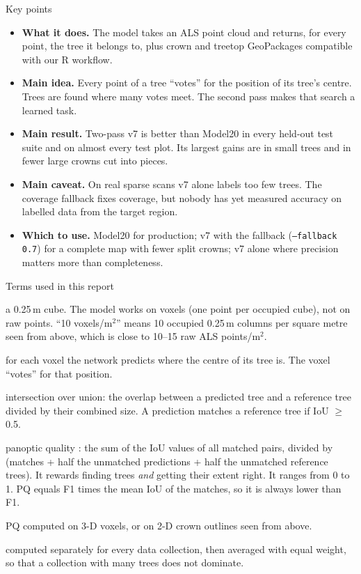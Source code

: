 \documentclass[11pt,a4paper]{article}
\newcommand{\ppsm}{points/m$^2$}
\newcommand{\vpsm}{voxels/m$^2$}
\newcommand{\code}[1]{\texttt{#1}}
\begin{document}
\begin{keybox}{Key points}
\begin{itemize}[leftmargin=12pt]
  \item \textbf{What it does.} The model takes an ALS point cloud and returns, for every point, the tree it belongs to, plus crown and treetop GeoPackages compatible with our R workflow.
  \item \textbf{Main idea.} Every point of a tree ``votes'' for the position of its tree's centre. Trees are found where many votes meet. The second pass makes that search a learned task.
  \item \textbf{Main result.} Two-pass v7 is better than Model20 in every held-out test suite and on almost every test plot. Its largest gains are in small trees and in fewer large crowns cut into pieces.
  \item \textbf{Main caveat.} On real sparse scans v7 alone labels too few trees. The coverage fallback fixes coverage, but nobody has yet measured accuracy on labelled data from the target region.
  \item \textbf{Which to use.} Model20 for production; v7 with the fallback (\code{--fallback 0.7}) for a complete map with fewer split crowns; v7 alone where precision matters more than completeness.
\end{itemize}
\end{keybox}

\begin{keybox}{Terms used in this report}
\begin{description}[leftmargin=12pt,labelindent=0pt,font=\normalfont\itshape]
  \item[Voxel] a 0.25\,m cube. The model works on voxels (one point per occupied cube), not on raw points. ``10 \vpsm'' means 10 occupied 0.25\,m columns per square metre seen from above, which is close to 10--15 raw ALS \ppsm.
  \item[Vote] for each voxel the network predicts where the centre of its tree is. The voxel ``votes'' for that position.
  \item[IoU] intersection over union: the overlap between a predicted tree and a reference tree divided by their combined size. A prediction matches a reference tree if IoU $\geq$ 0.5.
  \item[PQ] panoptic quality \citep{kirillov2019pq}: the sum of the IoU values of all matched pairs, divided by (matches + half the unmatched predictions + half the unmatched reference trees). It rewards finding trees \emph{and} getting their extent right. It ranges from 0 to 1. PQ equals F1 times the mean IoU of the matches, so it is always lower than F1.
  \item[Point / crown PQ] PQ computed on 3-D voxels, or on 2-D crown outlines seen from above.
  \item[Source-balanced (SB)] computed separately for every data collection, then averaged with equal weight, so that a collection with many trees does not dominate.
\end{description}
\end{keybox}
\end{document}

